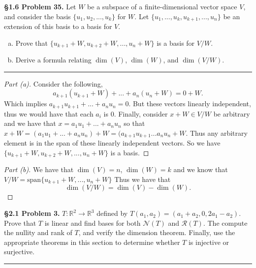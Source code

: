 \documentclass[leqno]{article}
\theoremstyle{nonumberplain}
\newtheorem{proof}{Proof}
\begin{document}
\noindent\textbf{\S 1.6 Problem 35.} Let $W$ be a subspace of a finite-dimensional vector space $V$, and consider the basis $\{u_1,u_2,...,u_k\}$ for $W$. Let $\{u_1,...,u_k,u_{k+1}, ..., u_n\}$ be an extension of this basis to a basis for $V$.
\begin{enumerate}[(a)]
\item Prove that $\{u_{k+1}+W,u_{k+2}+W,...,u_n+W\}$ is a basis for $V/W$.
\item Derive a formula relating $\dim(V)$, $\dim(W)$, and $\dim(V/W)$.
\end{enumerate}

\noindent\rule[0.5ex]{\linewidth}{1pt}

\begin{proof}[Part (a)]
Consider the following,
\[
a_{k+1}(u_{k+1}+W)+...+a_n(u_n+W)=0+W.
\]
Which implies $a_{k+1}u_{k+1}+...+a_n u_n=0$. But these vectors linearly independent, thus we would have that each $a_i$ is 0. Finally, consider $x+W \in V/W$ be arbitrary and we have that $x=a_1 u_1+...+a_n u_n$ so that $x+W=(a_1 u_1 + ... + a_n u_n)+W=(a_{k+1}u_{k+1}...a_n u_n + W$. Thus any arbitrary element is in the span of these linearly independent vectors.  So we have $\{u_{k+1}+W,u_{k+2}+W,...,u_n+W\}$ is a basis.
\end{proof}

\begin{proof}[Part (b)]
We have that $\dim(V)=n$, $\dim(W)=k$ and we know that $V/W=\textrm{span}\{u_{k+1}+W,...,u_n+W\}$ Thus we have that
\[
\dim(V/W)=\dim(V)-\dim(W).
\]
\end{proof}

\pagebreak





\noindent\textbf{\S 2.1 Problem 3.}  $T\colon \mathbb{R}^2 \to \mathbb{R}^3$ defined by $T(a_1,a_2)=(a_1+a_2,0,2a_1-a_2)$. Prove that $T$ is linear and find bases for both $\mathcal{N}(T)$ and $\mathcal{R}(T)$. The compute the nullity and rank of $T$, and verify the dimension theorem. Finally, use the appropriate theorems in this section to determine whether $T$ is injective or surjective.

\noindent\rule[0.5ex]{\linewidth}{1pt}
\end{document}
